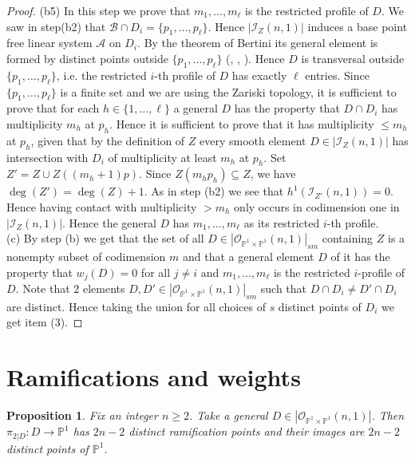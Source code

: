 \documentclass[
  a4paper, 
  reqno, 
  oneside, 
  11pt
]{amsart}
\theoremstyle{plain}	%
\newtheorem{proposition}{Proposition}
\theoremstyle{mydef} %
\theoremstyle{remark}
\theoremstyle{definition}
\theoremstyle{remark}
\begin{document}
\begin{proof}
{ (b5)} In this step we prove that $m_1,\dots ,m_\ell$ is the restricted profile of $D$. We saw in step(b2) that $\mathcal B\cap D_i=\{p_1,\dots,p_\ell\}$.
Hence $|\mathcal I_Z(n,1)|$ induces a base point free linear system $\mathcal A$ on $D_i$. By the theorem of Bertini its general element is formed by distinct points outside
$\{p_1,\dots ,p_\ell\}$ (\cite[p.]{GH}, \cite[III.10.9]{h}, \cite[6.3]{jou}). Hence $D$ is transversal outside $\{p_1,\dots ,p_\ell\}$, i.e. the restricted $i$-th profile of $D$ has exactly $\ell$ entries. Since $\{p_1,\dots ,p_\ell\}$ is a finite set and we are using the Zariski topology, it is sufficient to prove that for each $h\in \{1,\dots ,\ell\}$ a general $D$ has the property that $D\cap D_i$ has multiplicity $m_h$ at $p_h$. Hence it is sufficient to prove that it has multiplicity $\le m_h$ at $p_h$, given that by the definition of $Z$ every smooth element $D\in |\mathcal{I}_Z(n,1)|$ has intersection with $D_i$ of multiplicity at least $m_h$ at $p_h$.
Set $Z'= Z\cup Z((m_h+1)p)$.
Since $Z(m_hp_h)\subseteq Z$, we have $\deg(Z') =\deg(Z)+1$. As in step {(b2)} we see that $h^1(\mathcal I_{Z'}(n,1)) =0$. Hence having contact with multiplicity $>m_h$ only occurs in codimension one in $|\mathcal I_Z(n,1)|$. Hence the general $D$ has $m_1,\dots ,m_\ell$ as its restricted $i$-th profile.\\


{(c)} By step {(b)} we get that the set of all $D\in |\mathcal O_{\mathbb P^1\times \mathbb P^1}(n,1)|_{sm}$ containing $Z$ is a nonempty subset of codimension $m$ and  that a general element $D$ of it has the property that $w_j(D)=0$ for all $j\ne i$ and $m_1,\dots ,m_\ell$ is the restricted $i$-profile of $D$. Note that $2$ elements $D, D'\in |\mathcal O_{\mathbb P^1\times \mathbb P^1}(n,1)|_{sm}$ such that $D\cap D_i\ne D'\cap D_i$ are distinct.
Hence taking the union for all choices of $s$ distinct points of $D_i$ we get item (3).
\end{proof}





\section{Ramifications and   weights}


\begin{proposition}\label{Wrr6}
Fix an integer $n\ge 2$. Take a general $D\in |\mathcal O_{\mathbb P^1\times \mathbb P^1}(n,1)|$. Then $\pi_{2|D}: D\to \mathbb P^1$ has $2n-2$ distinct ramification points and their images are $2n-2$ distinct points of $\mathbb P^1$.
\end{proposition}
\end{document}
